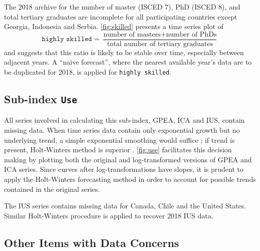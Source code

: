 The 2018 archive for the number of master (ISCED 7), PhD (ISCED 8), and total tertiary graduates are incomplete for all participating countries except Georgia, Indonesia and Serbia. \cref{fig:skilled} presents a time series plot of
\[ \texttt{highly skilled} = \frac{\text{number of masters} + \text{number of PhDs}}{\text{total number of tertiary graduates}} \]
and suggests that this ratio is likely to be stable over time, especially between adjacent years. A ``naive forecast'', where the nearest available year's data are to be duplicated for 2018, is applied for \texttt{highly skilled}.


\subsection{Sub-index \texttt{Use}}

All series involved in calculating this sub-index, GPEA, ICA and IUS, contain missing data. When time series data contain only exponential growth but no underlying trend, a simple exponential smoothing would suffice \parencite{garder:1985}; if trend is present, Holt-Winters method is superior \parencite{chatfield:1978}. \cref{fig:use} facilitates this decision making by plotting both the original and log-transformed versions of GPEA and ICA series. Since curves after log-transformations have slopes, it is prudent to apply the Holt-Winters forecasting method in order to account for possible trends contained in the original series.


The IUS series contains missing data for Canada, Chile and the United States. Similar Holt-Winters procedure is applied to recover 2018 IUS data.



\subsection{Other Items with Data Concerns}

